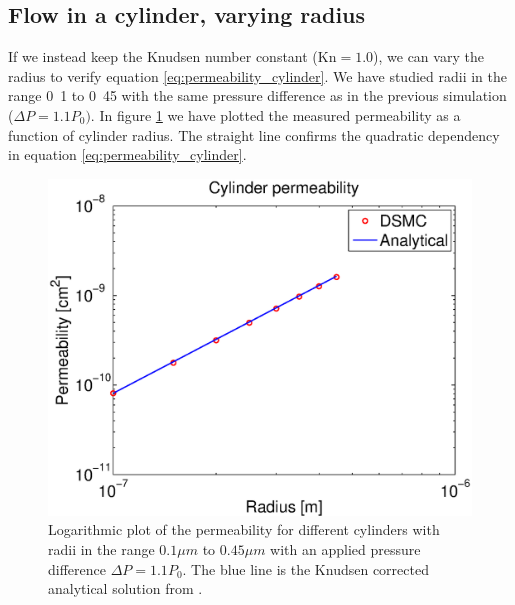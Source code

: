 \subsection{Flow in a cylinder, varying radius}
If we instead keep the Knudsen number constant ($\text{Kn}=1.0$), we can vary the radius to verify equation \eqref{eq:permeability_cylinder}. We have studied radii in the range \unit{0.1}{\micro\meter} to \unit{0.45}{\micro\meter} with the same pressure difference as in the previous simulation ($\Delta P = 1.1P_0)$. In figure \ref{fig:one_cylinder_varying_radii_result} we have plotted the measured permeability as a function of cylinder radius. The straight line confirms the quadratic dependency in equation \eqref{eq:permeability_cylinder}.
\begin{figure}[h]
\begin{center}
\includegraphics[width=\textwidth, trim=0cm 0cm 0cm 0cm, clip]{DSMC/figures/cylinder_radius_permeability.eps}
\end{center}
\caption{Logarithmic plot of the permeability for different cylinders with radii in the range $0.1 \mu m$ to $0.45 \mu m$ with an applied pressure difference $\Delta P = 1.1P_0$. The blue line is the Knudsen corrected analytical solution from \cite{karniadakis2005microflows}.}
\label{fig:one_cylinder_varying_radii_result}
\end{figure}

